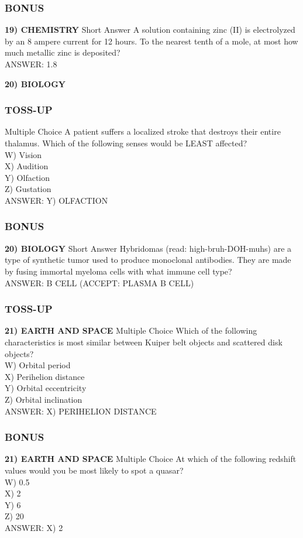 \subsubsection*{BONUS}
\textbf{19) CHEMISTRY}
Short Answer A solution containing zinc (II) is electrolyzed by an 8 ampere current for 12 hours. To the nearest tenth of a mole, at most how much metallic zinc is deposited?
\\ANSWER: 1.8

\newpage

\textbf{20) BIOLOGY}
\subsubsection*{TOSS-UP}
Multiple Choice A patient suffers a localized stroke that destroys their entire thalamus. Which of the following senses would be LEAST affected?
\\W) Vision
\\X) Audition
\\Y) Olfaction
\\Z) Gustation
\\ANSWER: Y) OLFACTION

\subsubsection*{BONUS}
\textbf{20) BIOLOGY}
Short Answer Hybridomas (read: high-bruh-DOH-muhs) are a type of synthetic tumor used to produce monoclonal antibodies. They are made by fusing immortal myeloma cells with what immune cell type?
\\ANSWER: B CELL (ACCEPT: PLASMA B CELL)

\subsubsection*{TOSS-UP}
\textbf{21) EARTH AND SPACE}
Multiple Choice Which of the following characteristics is most similar between Kuiper belt objects and scattered disk objects?
\\W) Orbital period
\\X) Perihelion distance
\\Y) Orbital eccentricity
\\Z) Orbital inclination
\\ANSWER: X) PERIHELION DISTANCE

\subsubsection*{BONUS}
\textbf{21) EARTH AND SPACE}
Multiple Choice At which of the following redshift values would you be most likely to spot a quasar?
\\W) 0.5
\\X) 2
\\Y) 6
\\Z) 20
\\ANSWER: X) 2

